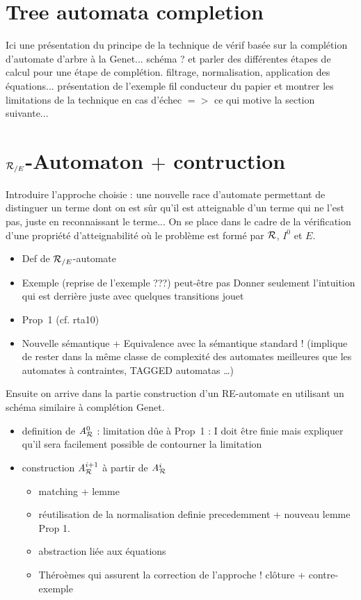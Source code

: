 \documentclass{fsttcs}
\begin{document}
\section{Tree automata completion}
\label{sec:completion}
Ici une présentation du principe de la technique de vérif basée sur
la complétion d'automate d'arbre à la Genet... schéma ?
et parler des différentes étapes de calcul pour une étape de complétion.
filtrage, normalisation, application des équations...
présentation de l'exemple fil conducteur du papier
et montrer les limitations de la technique en cas d'échec $=>$
ce qui motive la section suivante...


\section{${\mathcal R_{/E}}$-Automaton $+$ contruction}
\label{sec:automaton}
Introduire l'approche choisie :
une nouvelle race d'automate permettant de distinguer un terme dont on est sûr
qu'il est atteignable d'un terme qui ne l'est pas, juste en reconnaissant le
terme...
On se place dans le cadre de la vérification d'une propriété d'atteignabilité
où le problème est formé par $\mathcal R$, $I^0$ et $E$.
\begin{itemize}
\item Def de ${\mathcal R_{/E}}$-automate
\item Exemple (reprise de l'exemple ???) peut-être pas
  Donner seulement l'intuition qui est derrière juste avec quelques transitions jouet

\item Prop~1 (cf. rta10)
\item Nouvelle sémantique  + Equivalence avec la sémantique standard !
(implique de rester dans la même classe de complexité des automates
meilleures que les automates à contraintes, TAGGED automatas \dots)
\end{itemize}

Ensuite on arrive dans la partie construction d'un RE-automate en utilisant
un schéma similaire à complétion Genet.

\begin{itemize}
\item definition de ${\it A}_{\mathcal R}^0$ : limitation dûe à Prop~1 : I doit être finie
  mais expliquer qu'il sera facilement possible de contourner la limitation

\item construction ${\it A}_{\mathcal R}^{i+1}$ à partir de ${\it A}_{\mathcal R}^i$
  \begin{itemize}
  \item matching + lemme 
  \item réutilisation de la normalisation definie precedemment + nouveau lemme Prop 1.
  \item abstraction liée aux équations
  \item Théroèmes qui assurent la correction de l'approche ! clôture + contre-exemple
  \end{itemize}
\end{itemize}
\end{document}
